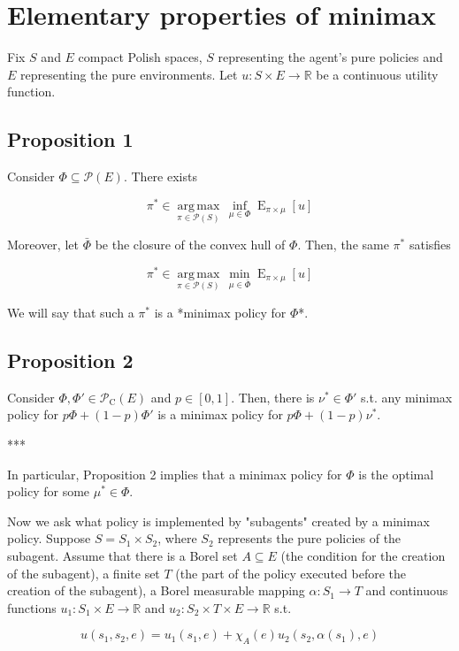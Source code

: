 \documentclass[a4paper]{article}
\DeclareMathOperator{\E}{E}
\newcommand{\Argmax}[1]{\underset{#1}{\operatorname{arg\,max}}\,}
\newcommand{\Reals}{\mathbb{R}}
\newcommand{\Prob}{\mathcal{P}}
\newcommand{\CC}{\mathcal{P}_{\operatorname{C}}}
\begin{document}
\section{Elementary properties of minimax}

Fix ${S}$ and ${E}$ compact Polish spaces, ${S}$ representing the agent's pure policies and ${E}$ representing the pure environments. Let ${u: S \times E \rightarrow \Reals}$ be a continuous utility function.

\subsection{Proposition 1}

Consider ${\Phi \subseteq \Prob(E)}$. There exists 

$${\pi^* \in \Argmax{\pi \in \Prob(S)} \inf_{\mu \in \Phi} \E_{\pi \times \mu}[u]}$$

Moreover, let ${\bar{\Phi}}$ be the closure of the convex hull of ${\Phi}$. Then, the same ${\pi^*}$ satisfies

$${\pi^* \in \Argmax{\pi \in \Prob(S)} \min_{\mu \in \bar{\Phi}} \E_{\pi \times \mu}[u]}$$

We will say that such a ${\pi^*}$ is a *minimax policy for ${\Phi}$*.

\subsection{Proposition 2}

Consider ${\Phi, \Phi' \in \CC(E)}$ and ${p \in [0,1]}$. Then, there is ${\nu^* \in \Phi'}$ s.t. any minimax policy for ${p\Phi+(1-p)\Phi'}$ is a minimax policy for ${p\Phi+(1-p)\nu^*}$.

***

In particular, Proposition 2 implies that a minimax policy for ${\Phi}$ is the optimal policy for some ${\mu^* \in \Phi}$.

Now we ask what policy is implemented by "subagents" created by a minimax policy. Suppose ${S = S_1 \times S_2}$, where ${S_2}$ represents the pure policies of the subagent. Assume that there is a Borel set ${A \subseteq E}$ (the condition for the creation of the subagent), a finite set ${T}$ (the part of the policy executed before the creation of the subagent), a Borel measurable mapping ${\alpha: S_1 \rightarrow T}$ and continuous functions ${u_1: S_1 \times E \rightarrow \Reals}$ and ${u_2: S_2 \times T \times E \rightarrow \Reals}$ s.t. 

$${u(s_1,s_2,e)=u_1(s_1,e)+\chi_A(e) u_2(s_2,\alpha(s_1),e)}$$
\end{document}
